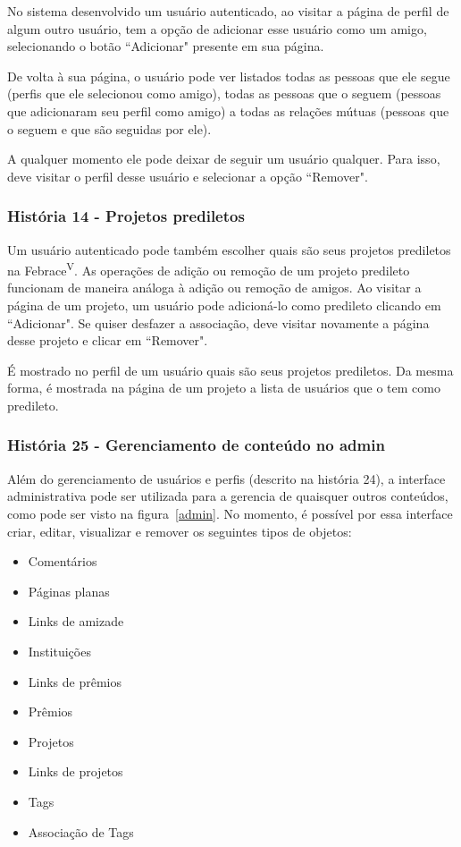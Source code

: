       No sistema desenvolvido um usuário autenticado, ao visitar a página de perfil de algum outro usuário, tem a opção de adicionar esse usuário como um amigo, selecionando o botão “Adicionar" presente em sua página.

      De volta à sua página, o usuário pode ver listados todas as pessoas que ele segue (perfis que ele selecionou como amigo), todas as pessoas que o seguem (pessoas que adicionaram seu perfil como amigo) a todas as relações mútuas (pessoas que o seguem e que são seguidas por ele).

      A qualquer momento ele pode deixar de seguir um usuário qualquer. Para isso, deve visitar o perfil desse usuário e selecionar a opção “Remover".

    \subsubsection{História 14 - Projetos prediletos}
      Um usuário autenticado pode também escolher quais são seus projetos prediletos na Febrace\textsuperscript{V}. As operações de adição ou remoção de um projeto predileto funcionam de maneira análoga à adição ou remoção de amigos. Ao visitar a página de um projeto, um usuário pode adicioná-lo como predileto clicando em “Adicionar". Se quiser desfazer a associação, deve visitar novamente a página desse projeto e clicar em “Remover".

      É mostrado no perfil de um usuário quais são seus projetos prediletos. Da mesma forma, é mostrada na página de um projeto a lista de usuários que o tem como predileto.

    \subsubsection{História 25 - Gerenciamento de conteúdo no admin}
      Além do gerenciamento de usuários e perfis (descrito na história 24), a interface administrativa pode ser utilizada para a gerencia de quaisquer outros conteúdos, como pode ser visto na figura~\ref{admin}. No momento, é possível por essa interface criar, editar, visualizar e remover os seguintes tipos de objetos:

      \begin{multicols}{3}
      \begin{itemize}
        \item{Comentários}
        \item{Páginas planas}
        \item{Links de amizade}
        \item{Instituições}
        \item{Links de prêmios}
        \item{Prêmios}
        \item{Projetos}
        \item{Links de projetos}
        \item{Tags}
        \item{Associação de Tags}
      \end{itemize}
      \end{multicols}

